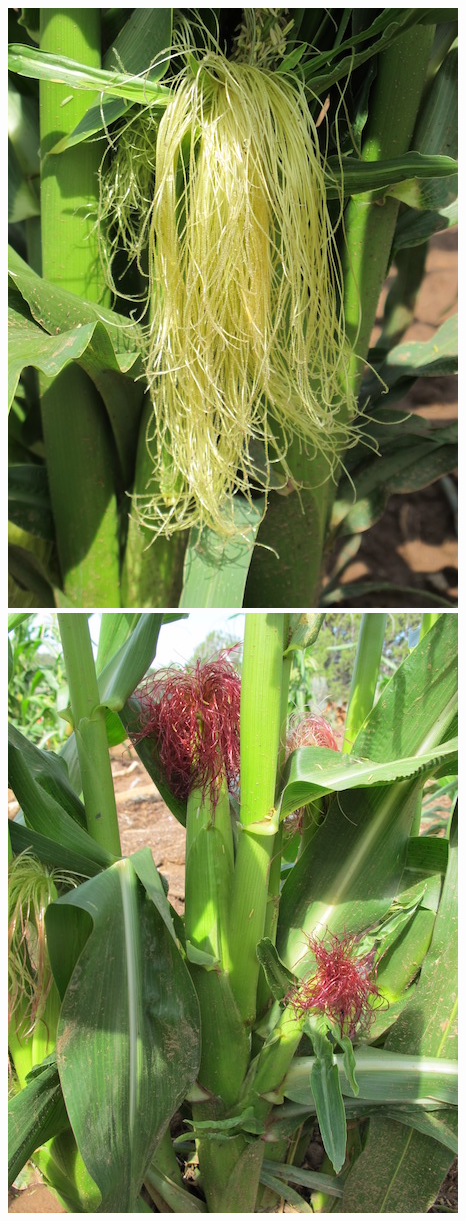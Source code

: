 \documentclass[12pt,]{article}
\begin{document}
\includegraphics{./images/growth/9_silking.jpg}
\includegraphics{./images/growth/10_silking.jpg}
\end{document}
